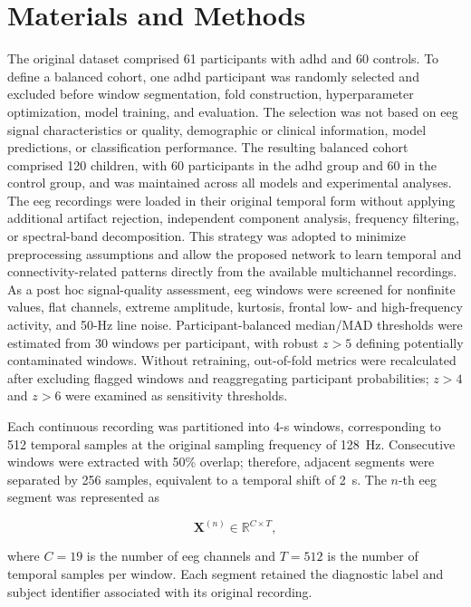 \section{Materials and Methods}

{The original dataset comprised 61 participants with \gls{adhd} and 60 controls. To define a balanced cohort, one \gls{adhd} participant was randomly selected and excluded before window segmentation, fold construction, hyperparameter optimization, model training, and evaluation. The selection was not based on \gls{eeg} signal characteristics or quality, demographic or clinical information, model predictions, or classification performance. The resulting balanced cohort comprised 120 children, with 60 participants in the \gls{adhd} group and 60 in the control group, and was maintained across all models and experimental analyses.} The \gls{eeg} recordings were loaded in their original temporal form without applying additional artifact rejection, independent component analysis, frequency filtering, or spectral-band decomposition. This strategy was adopted to minimize preprocessing assumptions and allow the proposed network to learn temporal and connectivity-related patterns directly from the available multichannel recordings. As a post hoc signal-quality assessment, \gls{eeg} windows were screened for nonfinite values, flat channels, extreme amplitude, kurtosis, frontal low- and high-frequency activity, and 50-Hz line noise. Participant-balanced median/MAD thresholds were estimated from 30 windows per participant, with robust $z>5$ defining potentially contaminated windows. Without retraining, out-of-fold metrics were recalculated after excluding flagged windows and reaggregating participant probabilities; $z>4$ and $z>6$ were examined as sensitivity thresholds.

Each continuous recording was partitioned into 4-s windows, corresponding to 512 temporal samples at the original sampling frequency of 128~Hz. Consecutive windows were extracted with 50\% overlap; therefore, adjacent segments were separated by 256 samples, equivalent to a temporal shift of 2~s. The $n$-th \gls{eeg} segment was represented as

\begin{equation}
    \mathbf{X}^{(n)} \in \mathbb{R}^{C \times T},
\end{equation}

where $C=19$ is the number of \gls{eeg} channels and $T=512$ is the number of temporal samples per window. Each segment retained the diagnostic label and subject identifier associated with its original recording.

